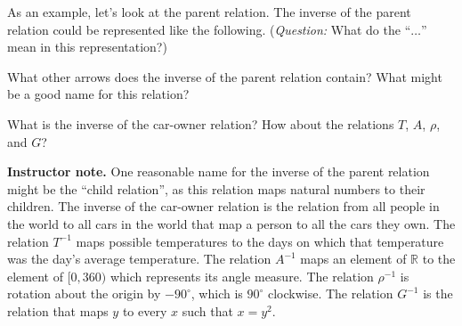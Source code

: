 \documentclass[11pt]{article}
\newcommand\smallnote[1]
	{\begin{mdframed}\raggedright  {\bf Instructor note.} {#1} \end{mdframed}}
\newenvironment{task}
	{\begin{mdframed}[linecolor=lightgray, linewidth=3pt]\raggedright}
	{\end{mdframed}}
\newcommand{\R}{\mathbb{R}}
\newcommand{\N}{\mathbb{N}}
\newcommand\degrees{^\circ}
\theoremstyle{definition}
\begin{document}
\vspace*{-2pt}
\begin{minipage}{4in}
As an example, let's look at the parent relation. The inverse of the parent relation could be represented like the following. ({\it Question:} What do the ``$\dots$'' mean in this representation?) 

\vspace*{-2pt}
\begin{task}
What other arrows does the inverse of the parent relation contain? What might be a good name for this relation?

What is the inverse of the car-owner relation? How about the relations $T$, $A$, $\rho$, and $G$?
\end{task}
\end{minipage}
\begin{minipage}{2.4in}
 \begin{center}
\end{center}
\end{minipage}

\vspace*{-6pt}
\smallnote{One reasonable name for the inverse of the parent relation might be the ``child relation'', as this relation maps natural numbers to their children. The inverse of the car-owner relation is the relation from all people in the world to all cars in the world that map a person to all the cars they own. The relation $T^{-1}$ maps possible temperatures to the days on which that temperature was the day's average temperature. The relation $A^{-1}$ maps an element of $\R$ to the element of $[0,360)$ which represents its angle measure. The relation $\rho^{-1}$ is rotation about the origin by $-90\degrees$, which is $90\degrees$ clockwise. The relation $G^{-1}$ is the relation that maps $y$ to every $x$ such that $x=y^2$.}
\end{document}
